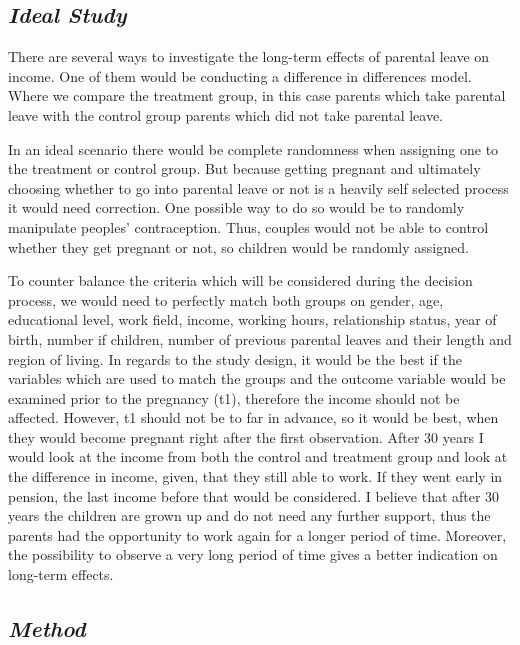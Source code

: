 \documentclass[
  12pt,
]{article}
\begin{document}
\hypertarget{ideal-study}{%
\subsection*{\texorpdfstring{\emph{Ideal Study}}{Ideal Study}}\label{ideal-study}}

There are several ways to investigate the long-term effects of parental leave on income. One of them would be conducting a difference in differences model. Where we compare the treatment group, in this case parents which take parental leave with the control group parents which did not take parental leave.

In an ideal scenario there would be complete randomness when assigning one to the treatment or control group. But because getting pregnant and ultimately choosing whether to go into parental leave or not is a heavily self selected process it would need correction. One possible way to do so would be to randomly manipulate peoples' contraception. Thus, couples would not be able to control whether they get pregnant or not, so children would be randomly assigned.

To counter balance the criteria which will be considered during the decision process, we would need to perfectly match both groups on gender, age, educational level, work field, income, working hours, relationship status, year of birth, number if children, number of previous parental leaves and their length and region of living.
In regards to the study design, it would be the best if the variables which are used to match the groups and the outcome variable would be examined prior to the pregnancy (t1), therefore the income should not be affected. However, t1 should not be to far in advance, so it would be best, when they would become pregnant right after the first observation. After 30 years I would look at the income from both the control and treatment group and look at the difference in income, given, that they still able to work. If they went early in pension, the last income before that would be considered. I believe that after 30 years the children are grown up and do not need any further support, thus the parents had the opportunity to work again for a longer period of time. Moreover, the possibility to observe a very long period of time gives a better indication on long-term effects.

\hypertarget{method}{%
\subsection*{\texorpdfstring{\emph{Method}}{Method}}\label{method}}
\end{document}
